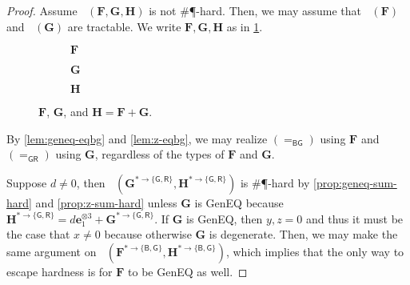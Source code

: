 \documentclass[11pt]{article}
\DeclareMathOperator{\holbs}{Holant^*_2}
\DeclareMathOperator{\holts}{Holant^*_3}
\newcommand{\db}{\mathsf{B}}
\newcommand{\dg}{\mathsf{G}}
\newcommand{\dr}{\mathsf{R}}
\newcommand{\geneq}{\textsf{GenEQ}\xspace}
\newcommand{\sph}{\#\P-hard\xspace}
\newcommand{\teh}{^{\otimes 3}}
\newcommand{\domres}[1]{
  ^{*\to\{#1\}}
}
\begin{document}
\begin{proof}
Assume $\holts(\mathbf{F}, \mathbf{G}, \mathbf{H})$ is not \sph.
Then, we may assume that $\holts(\mathbf{F})$ and $\holts(\mathbf{G})$ are tractable.
  We write $\mathbf{F}, \mathbf{G}, \mathbf{H}$ as in \cref{fig:f-g-h}.
\begin{figure}
  \centering
  \begin{subfigure}[b]{0.3\textwidth}
    \centering
\caption{$\mathbf{F}$}
\end{subfigure}
\hfill
\begin{subfigure}[b]{0.3\textwidth}
  \centering
\caption{$\mathbf{G}$}
\end{subfigure}
\hfill
\begin{subfigure}[b]{0.35\textwidth}
  \centering
\caption{$\mathbf{H}$}
\end{subfigure}
  \caption{$\mathbf{F}$, $\mathbf{G}$, and $\mathbf{H} = \mathbf{F} + \mathbf{G}$.} \label{fig:f-g-h}
\end{figure}
By \cref{lem:geneq-eqbg} and \cref{lem:z-eqbg}, we may realize $(=_{\db \dg})$ using $\mathbf{F}$ and $(=_{\dg \dr})$ using $\mathbf{G}$, regardless of the types of $\mathbf{F}$ and $\mathbf{G}$.

Suppose $d \ne 0$, then $\holbs(\mathbf{G}\domres{\dg, \dr}, \mathbf{H}\domres{\dg, \dr})$ is \sph by \cref{prop:geneq-sum-hard} and \cref{prop:z-sum-hard} unless $\mathbf{G}$ is \geneq because $\mathbf{H}\domres{\dg, \dr} = d \mathbf{e}_1\teh + \mathbf{G}\domres{\dg, \dr}$.
If $\mathbf{G}$ is \geneq, then $y, z = 0$ and thus it must be the case that $x \ne 0$ because otherwise $\mathbf{G}$ is degenerate.
Then, we may make the same argument on $\holbs(\mathbf{F}\domres{\db, \dg}, \mathbf{H}\domres{\db, \dg})$, which implies that the only way to escape hardness is for $\mathbf{F}$ to be \geneq as well.


\end{proof}
\end{document}
